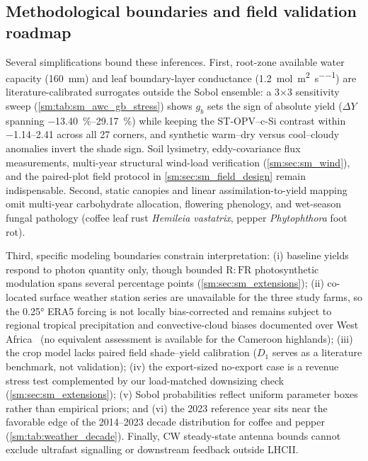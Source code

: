 \documentclass[preprint,12pt,a4paper]{elsarticle}
\begin{document}
\subsection{Methodological boundaries and field validation roadmap}
\label{sec:disc_limits}

Several simplifications bound these inferences. First, root-zone available water capacity (\qty{160}{\milli\meter}) and leaf boundary-layer conductance (\qty{1.2}{\mole\per\square\meter\per\second}) are literature-calibrated surrogates outside the Sobol ensemble: a \num{3}$\times$\num{3} sensitivity sweep (\cref{sm:tab:sm_awc_gb_stress}) shows $g_b$ sets the sign of absolute yield ($\Delta Y$ spanning \qtyrange{-13.40}{+29.17}{\percent}) while keeping the ST-OPV--c-Si contrast within \qtyrange{-1.14}{+2.41}{\pp} across all \num{27} corners, and synthetic warm--dry versus cool--cloudy anomalies invert the shade sign. Soil lysimetry, eddy-covariance flux measurements, multi-year structural wind-load verification (\cref{sm:sec:sm_wind}), and the paired-plot field protocol in \cref{sm:sec:sm_field_design} remain indispensable. Second, static canopies and linear assimilation-to-yield mapping omit multi-year carbohydrate allocation, flowering phenology, and wet-season fungal pathology (coffee leaf rust \textit{Hemileia vastatrix}, pepper \textit{Phytophthora} foot rot).

Third, specific modeling boundaries constrain interpretation: (i) baseline yields respond to photon quantity only, though bounded $\mathrm{R{:}FR}$ photosynthetic modulation spans several percentage points (\cref{sm:sec:sm_extensions}); (ii) co-located surface weather station series are unavailable for the three study farms, so the \ang{0.25} ERA5 forcing is not locally bias-corrected and remains subject to regional tropical precipitation and convective-cloud biases documented over West Africa~\cite{Gbode2023} (no equivalent assessment is available for the Cameroon highlands); (iii) the crop model lacks paired field shade--yield calibration ($D_1$ serves as a literature benchmark, not validation); (iv) the export-sized no-export case is a revenue stress test complemented by our load-matched downsizing check (\cref{sm:sec:sm_extensions}); (v) Sobol probabilities reflect uniform parameter boxes rather than empirical priors; and (vi) the 2023 reference year sits near the favorable edge of the 2014--2023 decade distribution for coffee and pepper (\cref{sm:tab:weather_decade}). Finally, CW steady-state antenna bounds cannot exclude ultrafast signalling or downstream feedback outside LHCII.
\end{document}
